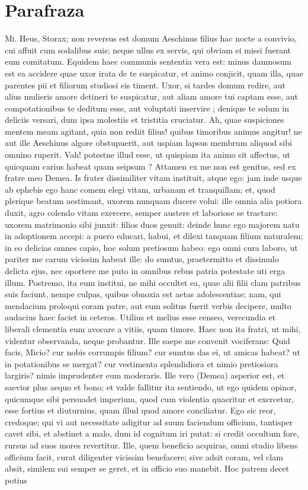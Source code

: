
\section*{Parafraza}

\textsc{Mi.} Heus, Storax; non reversus est domum Aeschinus filius hac nocte a convivio, cui affuit cum sodalibus suis; neque ullus ex servis, qui obviam ei missi fuerant eum comitatum. Equidem haec communis sententia vera est: minus damnosum est ea accidere quae uxor irata de te suspicatur, et animo conjicit, quam illa, quae parentes pii et filiorum studiosi eis timent. Uxor, si tardes domum redire, aut alius mulieris amore detineri te suspicatur, aut aliam amore tui captam esse, aut compotationibus te deditum esse, aut voluptati inservire ; denique te solum in deliciis versari, dum ipsa molestiis et tristitia cruciatur. Ah, quae suspiciones mentem meam agitant, quia non rediit filius! quibus timoribus animus angitur! ne aut ille Aeschinus algore obstupuerit, aut uspiam lapsus membrum aliquod sibi omnino ruperit. Vah! potestne illud esse, ut quispiam ita animo sit affectus, ut quicquam carius habeat quam seipsum ? Attamen ex me non est genitus, sed ex fratre meo Demea. Is frater dissimiliter vitam instituit, atque ego: jam inde usque ab ephebis ego hanc comem elegi vitam, urbanam et tranquillam; et, quod plerique beatum aestimant, uxorem nunquam ducere volui: ille omnia alia potiora duxit, agro colendo vitam exercere, semper austere et laboriose se tractare: uxorem matrimonio sibi junxit: filios duos genuit: deinde hunc ego majorem natu in adoptionem accepi: a puero educari, habui, et dilexi tanquam filium naturalem; in eo delicias omnes capio, hoc solum pretiosum habeo: ego omni cura laboro, ut pariter me carum vicissim habeat ille: do sumtus, praetermitto et dissimulo delicta ejus, nec oportere me puto in omnibus rebus patria potestate uti erga illum. Postremo, ita eum institui, ne mihi occultet ea, quae alii filii clam patribus suis faciunt, nempe culpas, quibus obnoxia est aetas adolescentiae; nam, qui mendacium proloqui coram patre, aut eum solitus fuerit verbis decipere, multo audacius haec faciet in ceteros. Utilius et melius esse censeo, verecundia et liberali clementia eum avocare a vitiis, quam timore. Haec non ita fratri, ut mihi, videntur observanda, neque probantur. Ille saepe me convenit vociferans: Quid facis, Micio? cur nobis corrumpis filium? cur sumtus das ei, ut amicas habeat? ut in potationibus se mergat? cur vestimenta splendidiora et nimio pretiosiora largiris? nimis imprudenter eum moderaris. Ille vero (Demea) asperior est, et saevior plus aequo et bono; et valde fallitur ita sentiendo, ut ego quidem opinor, quicumque sibi persuadet imperium, quod cum violentia quaeritur et exercetur, esse fortius et diuturnius, quam illud quod amore conciliatur. Ego sic reor, credoque; qui vi aut necessitate adigitur ad suum faciendum officium, tantisper cavet sibi, et abstinet a malo, dum id cognitum iri putat: si credit occultum fore, rursus ad suos mores revertitur. Ille, quem beneficio acquiras, omni studio libens officium facit, curat diligenter vicissim benefacere; sive adsit coram, vel clam absit, similem sui semper se geret, et in officio suo manebit. Hoc patrem decet potius 